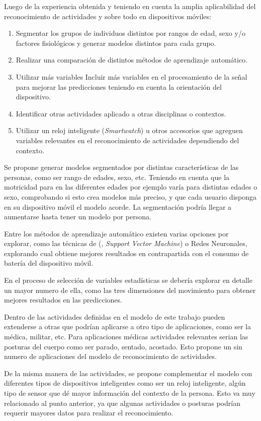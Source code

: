 Luego de la experiencia obtenida y teniendo en cuenta la amplia aplicabilidad
del reconocimiento de actividades y sobre todo en dispositivos móviles:
\begin{enumerate}
\item Segmentar los grupos de individuos distintos por rangos de edad, sexo
y/o factores fisiológicos y generar modelos distintos para cada grupo. 
\item Realizar una comparación de distintos métodos de aprendizaje automático. 
\item Utilizar más variables Incluir más variables en el procesamiento de
la señal para mejorar las predicciones teniendo en cuenta la orientación
del dispositivo. 
\item Identificar otras actividades aplicado a otras disciplinas o contextos. 
\item Utilizar un reloj inteligente (\emph{Smartwatch}) u otros accesorios
que agreguen variables relevantes en el reconocimiento de actividades
dependiendo del contexto. 
\end{enumerate}
Se propone generar modelos segmentados por distintas características
de las personas, como ser rango de edades, sexo, etc. Teniendo en
cuenta que la motricidad para en las diferentes edades por ejemplo
varía para distintas edades o sexo, comprobando si esto crea modelos
más preciso, y que cada usuario disponga en su dispositivo móvil el
modelo acorde. La segmentación podría llegar a aumentarse hasta tener
un modelo por persona.

Entre los métodos de aprendizaje automático existen varias opciones
por explorar, como las técnicas de (, \emph{Support Vector
Machine}) o Redes Neuronales, explorando cual obtiene mejores resultados
en contrapartida con el consumo de batería del dispositivo móvil.

En el proceso de selección de variables estadísticas se debería explorar
en detalle un mayor numero de ella, como las tres dimensiones del
movimiento para obtener mejores resultados en las predicciones. 

Dentro de las actividades definidas en el modelo de este trabajo pueden
extenderse a otras que podrían aplicarse a otro tipo de aplicaciones,
como ser la médica, militar, etc. Para aplicaciones médicas actividades
relevantes serian las posturas del cuerpo como ser parado, sentado,
acostado. Esto propone un sin numero de aplicaciones del modelo de
reconocimiento de actividades. 

De la misma manera de las actividades, se propone complementar el
modelo con diferentes tipos de dispositivos inteligentes como ser
un reloj inteligente, algún tipo de sensor que dé mayor información
del contexto de la persona. Esto va muy relacionado al punto anterior,
ya que algunas actividades o posturas podrían requerir mayores datos
para realizar el reconocimiento.

